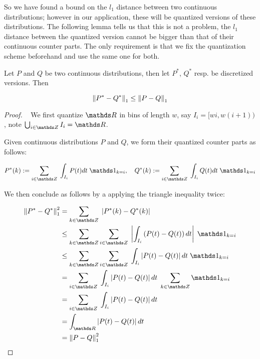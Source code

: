 So we have found a bound on the $l_1$ distance between two continuous distributions; however in our
application, these will be quantized versions of these distributions. The following lemma tells us 
that this is not a problem, the $l_1$ distance between the quantized version cannot be bigger than 
that of their continuous counter parts. The only requirement is that we fix the quantization scheme
beforehand and use the same one for both.

\begin{lemma}
    Let $P$ and $Q$ be two continuous distributions, then let $P^*$, $Q^*$ resp. be discretized versions.
    Then

    $$
        \left\lVert P^* - Q^*\right\rVert_1 \leq \left\lVert P - Q\right\rVert_1 
    $$
    \label{lemma:quantisation}
\end{lemma}

\begin{proof}
    ~
    We first quantize $\R$ in bins of length $w$, say $I_i = [wi, w(i + 1))$, note 
    $\bigcup_{i \in \Z} I_i = \R$.

    Given continuous distributions $P$ and $Q$, we form their quantized counter parts as
    follows:

    $$
        P^*(k) := \sum _{i \in \Z} \; \int_{I_i} P(t) dt \; \Ind_{k  = i}
        , \quad   Q^*(k) := \sum _{i \in \Z} \; \int_{I_i} Q(t) dt \; \Ind_{k  = i}
    $$

    We then conclude as follows by a applying the triangle inequality twice:

    \begin{align*}
        \norm{P^* - Q^*}_1^2 &= \sum _{k \in \Z} \; \left| P^*(k) - Q^*(k)\right|  \\
        &\leq \sum _{k \in \Z} \sum _{i \in \Z} \; \left| \int_{I_i} \left(P(t) - Q(t)\right) dt \right|  \; \Ind_{k  = i} \\
        &\leq \sum _{k \in \Z} \sum _{i \in \Z} \;  \int_{I_i} \left|P(t) - Q(t)\right| dt  \; \Ind_{k  = i} \\
        &= \sum _{i \in \Z} \;  \int_{I_i} \left|P(t) - Q(t)\right| dt  \; \sum _{k \in \Z} \Ind_{k  = i} \\
        &= \sum _{i \in \Z} \;  \int_{I_i} \left|P(t) - Q(t)\right| dt \\
        &= \int_{\R} \left|P(t) - Q(t)\right| dt \\
        &= \norm{P - Q}_1^2
    \end{align*}

\end{proof}

